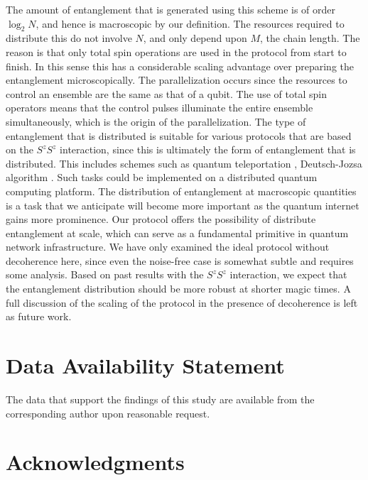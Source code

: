 \documentclass{WileyMSP-template}
\begin{document}
{The amount of entanglement that is generated using this scheme is of order $ \log_2 N$, and hence is macroscopic by our definition.   The resources required to distribute this do not involve $ N $, and only depend upon $ M $, the chain length.  The reason is that only total spin operations are used in the protocol from start to finish. In this sense this has a considerable scaling advantage over preparing the entanglement microscopically.  The parallelization occurs since the resources to control an ensemble are the same as that of a qubit. The use of total spin operators means that the control pulses illuminate the entire ensemble simultaneously, which is the origin of the parallelization.  The type of entanglement that is distributed is suitable for various protocols that are based on the $ S^z S^z $ interaction, since this is ultimately the form of entanglement that is distributed.  This includes schemes such as quantum teleportation \cite{pyrkov2014quantum,pyrkov2014full}, Deutsch-Jozsa algorithm \cite{semenenko2016implementing}. Such tasks could be implemented on a distributed quantum computing platform.  The distribution of entanglement at macroscopic quantities is a task that we anticipate will become more important as the quantum internet gains more prominence.  Our protocol offers the possibility of distribute entanglement at scale, which can serve as a fundamental primitive in quantum network infrastructure.  We have only examined the ideal protocol without decoherence here, since even the noise-free case is somewhat subtle and requires some analysis.  Based on past results with the $ S^z S^z $ interaction, we expect that the entanglement distribution should be more robust at shorter magic times.  A full discussion of the scaling of the protocol in the presence of decoherence is left as future work.










\section{Data Availability Statement}

The data that support the findings of this study are available from the corresponding author upon reasonable request.


\section{Acknowledgments}

}
\end{document}
